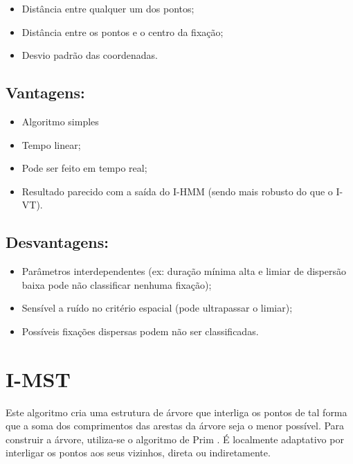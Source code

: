 \documentclass[brazil,]{report}
\begin{document}
\begin{itemize}
\itemsep1pt\parskip0pt
\item
  Distância entre qualquer um dos pontos;
\item
  Distância entre os pontos e o centro da fixação;
\item
  Desvio padrão das coordenadas.
\end{itemize}

\subsection{Vantagens:}\label{vantagens-2}

\begin{itemize}
\itemsep1pt\parskip0pt
\item
  Algoritmo simples
\item
  Tempo linear;
\item
  Pode ser feito em tempo real;
\item
  Resultado parecido com a saída do I-HMM (sendo mais robusto do que o
  I-VT).
\end{itemize}

\subsection{Desvantagens:}\label{desvantagens-2}

\begin{itemize}
\itemsep1pt\parskip0pt
\item
  Parâmetros interdependentes (ex: duração mínima alta e limiar de
  dispersão baixa pode não classificar nenhuma fixação);
\item
  Sensível a ruído no critério espacial (pode ultrapassar o limiar);
\item
  Possíveis fixações dispersas podem não ser classificadas.
\end{itemize}

\section{I-MST}\label{i-mst}

Este algoritmo cria uma estrutura de árvore que interliga os pontos de
tal forma que a soma dos comprimentos das arestas da árvore seja o menor
possível. Para construir a árvore, utiliza-se o algoritmo de Prim . É
localmente adaptativo por interligar os pontos aos seus vizinhos, direta
ou indiretamente.
\end{document}
